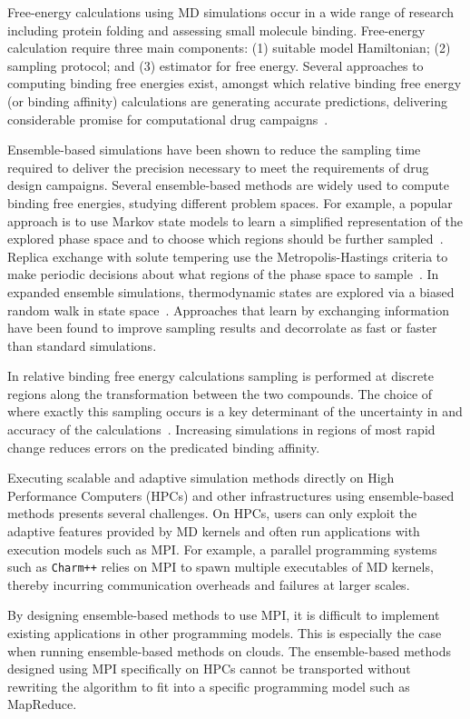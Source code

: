 Free-energy calculations using MD simulations occur in
a wide range of research including protein folding and assessing small molecule 
binding. Free-energy calculation require three main components: 
(1) suitable model Hamiltonian; (2) sampling protocol;
and (3) estimator for free energy. Several approaches to computing binding
free energies exist, amongst which relative binding free energy (or binding
affinity) calculations are generating accurate predictions, delivering
considerable promise for computational drug campaigns~\cite{Karplus2005}.

Ensemble-based simulations have been shown to reduce the sampling time
required to deliver the precision necessary to meet the requirements of drug
design campaigns. Several ensemble-based methods are widely used to compute 
binding free energies, studying different problem spaces. For example, a popular 
approach is to use Markov state models to learn a simplified representation of 
the explored phase space and to choose which regions should be further 
sampled~\cite{Bowman2010}. Replica exchange with solute tempering use the 
Metropolis-Hastings criteria to make periodic decisions about what regions of 
the phase space to sample~\cite{Earl2005,Hritz2008,Kim2012}. In
expanded ensemble simulations, thermodynamic states are explored via a biased
random walk in state space~\cite{Lyubartsev1992}. Approaches that learn by
exchanging information have been found to improve sampling results and
decorrolate as fast or faster than standard simulations.

In relative binding free energy calculations sampling is performed
at discrete regions along the transformation between the two compounds.
The choice of where exactly this sampling occurs is a key
determinant of the uncertainty in and accuracy of the
calculations~\cite{Ruiter2013, Ruiter2016}. Increasing simulations in regions of 
most rapid change reduces errors on the predicated binding affinity.

Executing scalable and adaptive simulation methods directly on High
Performance Computers (HPCs) and other infrastructures using ensemble-based
methods presents several challenges. On HPCs, users can only exploit the
adaptive features provided by MD kernels and often run applications with
execution models such as MPI. For example, a parallel programming systems
such as \texttt{Charm++} relies on MPI to spawn multiple executables of MD
kernels, thereby incurring communication overheads and failures at larger
scales.

By designing ensemble-based methods to use MPI, it is difficult to implement
existing applications in other programming models. This is especially the
case when running ensemble-based methods on clouds. The ensemble-based
methods designed using MPI specifically on HPCs cannot be transported without
rewriting the algorithm to fit into a specific programming model such as
MapReduce.

